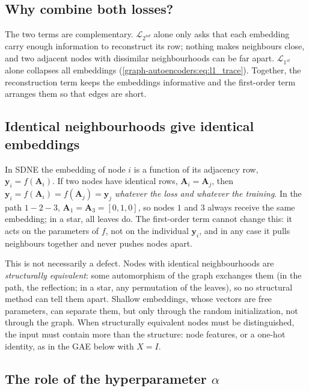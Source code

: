 \begin{notechapter}
\subsection{Why combine both losses?}

The two terms are complementary. $\mathcal{L}_{2^{nd}}$ alone only asks that each embedding carry enough information to reconstruct its row; nothing makes neighbours close, and two adjacent nodes with dissimilar neighbourhoods can be far apart. $\mathcal{L}_{1^{st}}$ alone collapses all embeddings (\cref{graph-autoencoders:eq:l1_trace}). Together, the reconstruction term keeps the embeddings informative and the first-order term arranges them so that edges are short.

\subsection{Identical neighbourhoods give identical embeddings}

\begin{remark}\label{graph-autoencoders:rem:identical}
In SDNE the embedding of node $i$ is a function of its adjacency row, $\bm y_i = f(\bm A_i)$. If two nodes have identical rows, $\bm A_i = \bm A_j$, then $\bm y_i = f(\bm A_i) = f(\bm A_j) = \bm y_j$ \emph{whatever the loss and whatever the training}. In the path $1 - 2 - 3$, $\bm A_1 = \bm A_3 = [0,1,0]$, so nodes $1$ and $3$ always receive the same embedding; in a star, all leaves do. The first-order term cannot change this: it acts on the parameters of $f$, not on the individual $\bm y_i$, and in any case it pulls neighbours together and never pushes nodes apart.

This is not necessarily a defect. Nodes with identical neighbourhoods are \emph{structurally equivalent}: some automorphism of the graph exchanges them (in the path, the reflection; in a star, any permutation of the leaves), so no structural method can tell them apart. Shallow embeddings, whose vectors are free parameters, can separate them, but only through the random initialization, not through the graph. When structurally equivalent nodes must be distinguished, the input must contain more than the structure: node features, or a one-hot identity, as in the GAE below with $X = I$.
\end{remark}

\subsection{The role of the hyperparameter $\alpha$}


\end{notechapter}
